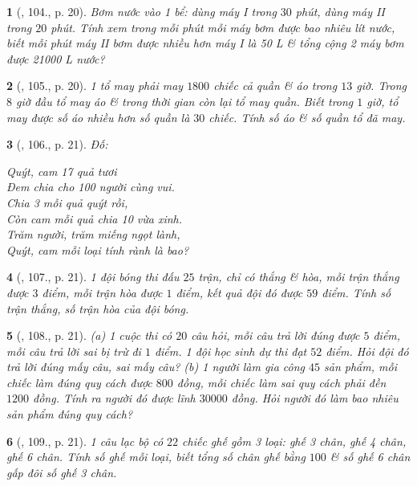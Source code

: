 \documentclass{article}
\newtheorem{baitoan}{}
\begin{document}
\begin{baitoan}[\cite{Binh_Toan_6_tap_1}, 104., p. 20]
	Bơm nước vào 1 bể: dùng máy {\rm I} trong $30$ phút, dùng máy {\rm II} trong $20$ phút. Tính xem trong mỗi phút mỗi máy bơm được bao nhiêu lít nước, biết mỗi phút máy {\rm II} bơm được nhiều hơn máy {\rm I} là {\rm50 L} \& tổng cộng 2 máy bơm được {\rm21000 L} nước?
\end{baitoan}

\begin{baitoan}[\cite{Binh_Toan_6_tap_1}, 105., p. 20]
	1 tổ may phải may $1800$ chiếc cả quần \& áo trong $13$ giờ. Trong $8$ giờ đầu tổ may áo \& trong thời gian còn lại tổ may quần. Biết trong $1$ giờ, tổ may được số áo nhiều hơn số quần là $30$ chiếc. Tính số áo \& số quần tổ đã may.
\end{baitoan}

\begin{baitoan}[\cite{Binh_Toan_6_tap_1}, 106., p. 21]
	Đố:
	\begin{center}
		Quýt, cam 17 quả tươi\\Đem chia cho 100 người cùng vui.\\Chia 3 mỗi quả quýt rồi,\\Còn cam mỗi quả chia 10 vừa xinh.\\Trăm người, trăm miếng ngọt lành,\\Quýt, cam mỗi loại tính rành là bao?
	\end{center}
\end{baitoan}

\begin{baitoan}[\cite{Binh_Toan_6_tap_1}, 107., p. 21]
	1 đội bóng thi đấu $25$ trận, chỉ có thắng \& hòa, mỗi trận thắng được $3$ điểm, mỗi trận hòa được $1$ điểm, kết quả đội đó được $59$ điểm. Tính số trận thắng, số trận hòa của đội bóng.
\end{baitoan}

\begin{baitoan}[\cite{Binh_Toan_6_tap_1}, 108., p. 21]
	(a) 1 cuộc thi có $20$ câu hỏi, mỗi câu trả lời đúng được $5$ điểm, mỗi câu trả lời sai bị trừ đi $1$ điểm. 1 đội học sinh dự thi đạt $52$ điểm. Hỏi đội đó trả lời đúng mấy câu, sai mấy câu? (b) 1 người làm gia công $45$ sản phẩm, mỗi chiếc làm đúng quy cách được $800$ đồng, mỗi chiếc làm sai quy cách phải đền $1200$ đồng. Tính ra người đó được lĩnh $30000$ đồng. Hỏi người đó làm bao nhiêu sản phẩm đúng quy cách?
\end{baitoan}

\begin{baitoan}[\cite{Binh_Toan_6_tap_1}, 109., p. 21]
	1 câu lạc bộ có $22$ chiếc ghế gồm 3 loại: ghế 3 chân, ghế 4 chân, ghế 6 chân. Tính số ghế mỗi loại, biết tổng số chân ghế bằng $100$ \& số ghế 6 chân gấp đôi số ghế 3 chân.
\end{baitoan}
\end{document}
